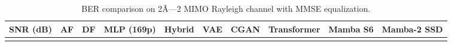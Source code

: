 \begin{longtable}[]{@{}
  >{\raggedright\arraybackslash}p{}
  >{\raggedright\arraybackslash}p{}
  >{\raggedright\arraybackslash}p{}
  >{\raggedright\arraybackslash}p{}
  >{\raggedright\arraybackslash}p{}
  >{\raggedright\arraybackslash}p{}
  >{\raggedright\arraybackslash}p{}
  >{\raggedright\arraybackslash}p{}
  >{\raggedright\arraybackslash}p{}
  >{\raggedright\arraybackslash}p{}@{}}
\caption{BER comparison on 2Ã—2 MIMO Rayleigh channel with MMSE equalization.}\label{tbl:table5}\tabularnewline
\toprule\noalign{}
\begin{minipage}[b]{\linewidth}\raggedright
SNR (dB)
\end{minipage} & \begin{minipage}[b]{\linewidth}\raggedright
AF
\end{minipage} & \begin{minipage}[b]{\linewidth}\raggedright
DF
\end{minipage} & \begin{minipage}[b]{\linewidth}\raggedright
MLP (169p)
\end{minipage} & \begin{minipage}[b]{\linewidth}\raggedright
Hybrid
\end{minipage} & \begin{minipage}[b]{\linewidth}\raggedright
VAE
\end{minipage} & \begin{minipage}[b]{\linewidth}\raggedright
CGAN
\end{minipage} & \begin{minipage}[b]{\linewidth}\raggedright
Transformer
\end{minipage} & \begin{minipage}[b]{\linewidth}\raggedright
Mamba S6
\end{minipage} & \begin{minipage}[b]{\linewidth}\raggedright
Mamba-2 SSD
\end{minipage} \\
\midrule\noalign{}
\endfirsthead
\toprule\noalign{}
\begin{minipage}[b]{\linewidth}\raggedright

\end{minipage}
\end{longtable}
